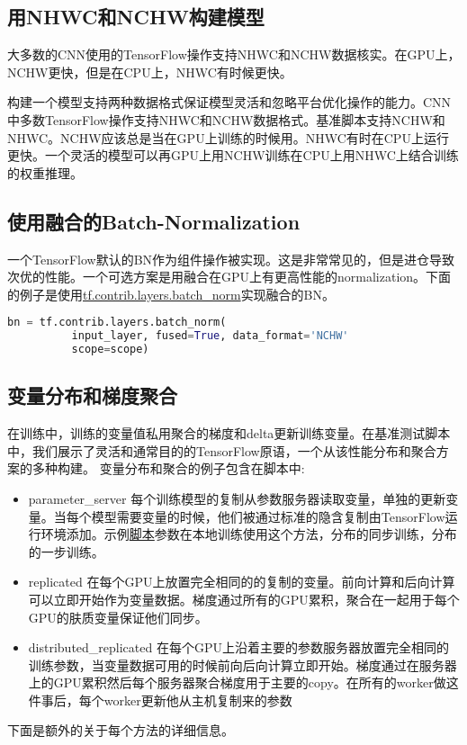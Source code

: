 \subsection{用NHWC和NCHW构建模型}
大多数的CNN使用的TensorFlow操作支持NHWC和NCHW数据核实。在GPU上，NCHW更快，但是在CPU上，NHWC有时候更快。

构建一个模型支持两种数据格式保证模型灵活和忽略平台优化操作的能力。CNN中多数TensorFlow操作支持NHWC和NCHW数据格式。基准脚本支持NCHW和NHWC。NCHW应该总是当在GPU上训练的时候用。NHWC有时在CPU上运行更快。一个灵活的模型可以再GPU上用NCHW训练在CPU上用NHWC上结合训练的权重推理。
\subsection{使用融合的Batch-Normalization}
一个TensorFlow默认的BN作为组件操作被实现。这是非常常见的，但是进仓导致次优的性能。一个可选方案是用融合在GPU上有更高性能的normalization。下面的例子是使用\href{https://www.tensorflow.org/api_docs/python/tf/contrib/layers/batch_norm}{tf.contrib.layers.batch\_norm}实现融合的BN。
\begin{lstlisting}[language=Python]
bn = tf.contrib.layers.batch_norm(
          input_layer, fused=True, data_format='NCHW'
          scope=scope)
\end{lstlisting}
\subsection{变量分布和梯度聚合}
在训练中，训练的变量值私用聚合的梯度和delta更新训练变量。在基准测试脚本中，我们展示了灵活和通常目的的TensorFlow原语，一个从该性能分布和聚合方案的多种构建。
变量分布和聚合的例子包含在脚本中:
\begin{itemize}
	\item parameter\_server 每个训练模型的复制从参数服务器读取变量，单独的更新变量。当每个模型需要变量的时候，他们被通过标准的隐含复制由TensorFlow运行环境添加。示例\href{https://github.com/tensorflow/benchmarks/tree/master/scripts/tf_cnn_benchmarks}{脚本}参数在本地训练使用这个方法，分布的同步训练，分布的一步训练。
	\item replicated 在每个GPU上放置完全相同的的复制的变量。前向计算和后向计算可以立即开始作为变量数据。梯度通过所有的GPU累积，聚合在一起用于每个GPU的肤质变量保证他们同步。
	\item distributed\_replicated 在每个GPU上沿着主要的参数服务器放置完全相同的训练参数，当变量数据可用的时候前向后向计算立即开始。梯度通过在服务器上的GPU累积然后每个服务器聚合梯度用于主要的copy。在所有的worker做这件事后，每个worker更新他从主机复制来的参数
\end{itemize}
下面是额外的关于每个方法的详细信息。
